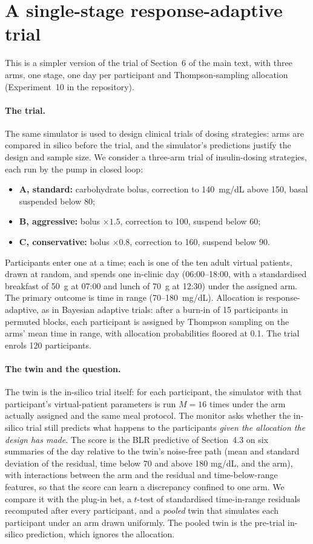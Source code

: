 \documentclass[11pt]{article}
\theoremstyle{remark}
\begin{document}
\section{A single-stage response-adaptive trial}\label{sec:trial3}

This is a simpler version of the trial of Section~6 of the main
text, with three arms, one stage, one day per participant and Thompson-sampling
allocation (Experiment~10 in the repository).

\paragraph{The trial.} The same simulator is used to design clinical trials of
dosing strategies: arms are compared in silico before the trial, and the
simulator's predictions justify the design and sample size. We consider a
three-arm trial of insulin-dosing strategies, each run by the pump in closed
loop:
\begin{itemize}
  \item \textbf{A, standard:} carbohydrate bolus, correction to 140~mg/dL above
        150, basal suspended below 80;
  \item \textbf{B, aggressive:} bolus $\times 1.5$, correction to 100, suspend
        below 60;
  \item \textbf{C, conservative:} bolus $\times 0.8$, correction to 160, suspend
        below 90.
\end{itemize}
Participants enter one at a time; each is one of the ten adult virtual
patients, drawn at random, and spends one in-clinic day (06:00--18:00, with a
standardised breakfast of 50~g at 07:00 and lunch of 70~g at 12:30) under the
assigned arm. The primary outcome is time in range (70--180~mg/dL).
Allocation is response-adaptive, as in Bayesian adaptive trials: after a
burn-in of 15 participants in permuted blocks, each participant is assigned by
Thompson sampling on the arms' mean time in range, with allocation
probabilities floored at 0.1. The trial enrols 120 participants.

\paragraph{The twin and the question.} The twin is the in-silico trial itself:
for each participant, the simulator with that participant's virtual-patient
parameters is run $M = 16$ times under the arm actually assigned and the same
meal protocol. The monitor asks whether the in-silico trial still predicts
what happens to the participants \emph{given the allocation the design has
made}. The score is the BLR predictive of Section~4.3 on six
summaries of the day relative to the twin's noise-free path (mean and standard
deviation of the residual, time below 70 and above 180 mg/dL, and the arm),
with interactions between the arm and the residual and time-below-range
features, so that the score can learn a discrepancy confined to one arm. We
compare it with the plug-in bet, a $t$-test of standardised time-in-range
residuals recomputed after every participant, and a \emph{pooled} twin that
simulates each participant under an arm drawn uniformly. The pooled twin is the
pre-trial in-silico prediction, which ignores the allocation.
\end{document}
